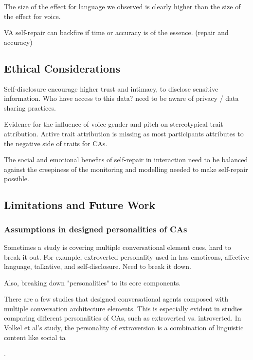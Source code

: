 \documentclass[sigconf,screen,review, anonymous]{acmart}
\newcommand{\cmt}[1]{}%
\begin{document}
The size of the effect for language we observed is clearly higher than the size of the effect for voice. \cite{habler2019effects}\cmt{[63]}

VA self-repair can backfire if time or accuracy is of the essence. (repair and accuracy) \cite{cuadra2021my}\cmt{[67]}

\subsection{Ethical Considerations}

Self-disclosure encourage higher trust and intimacy, to disclose sensitive information. Who have access to this data? need to be aware of privacy / data sharing practices. \cite{lee2020hear}\cmt{[23]}

Evidence for the influence of voice gender and pitch on stereotypical trait attribution. Active trait attribution is missing as most participants attributes to the negative side of traits for CAs. \cite{tolmeijer2021female}\cmt{[62]}

The social and emotional benefits of self-repair in interaction need to be balanced against the creepiness of the monitoring and modelling needed to make self-repair possible. \cite{cuadra2021my}\cmt{[67]}


\subsection{Limitations and Future Work}

\subsubsection{Assumptions in designed personalities of CAs}
Sometimes a study is covering multiple conversational element cues, hard to break it out. For example, extroverted personality used in \cite{volkel2022user}\cmt{[75]} has emoticons, affective language, talkative, and self-disclosure. Need to break it down.

Also, breaking down "personalities" to its core components.

There are a few studies that designed conversational agents composed with multiple conversation architecture elements. This is especially evident in studies comparing different personalities of CAs, such as extroverted vs. introverted. In Volkel et al's study, the personality of extraversion is a combination of linguistic content like social ta

\cite{moilanen2022measuring}\cmt{[82]}\cite{seeger2021chatbots}\cmt{[35]}\cite{volkel2021manipulating}\cmt{[68]}\cite{volkel2022user}\cmt{[75]}.
\end{document}
